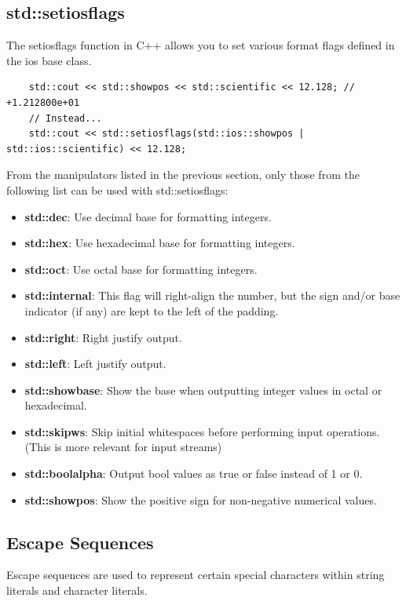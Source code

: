 \documentclass{report}
\begin{document}
    \subsection{std::setiosflags}
    The setiosflags function in C++ allows you to set various format flags defined in the ios base class. 
    \bigbreak \noindent 
    \sepline
    \begin{verbatim}
    std::cout << std::showpos << std::scientific << 12.128; // +1.212800e+01
    // Instead...
    std::cout << std::setiosflags(std::ios::showpos | std::ios::scientific) << 12.128; 
    \end{verbatim}
    \sepline
    \bigbreak \noindent 
    From the manipulators listed in the previous section, only those from the following list can be used with std::setiosflags:
    \begin{itemize}
        \item \textbf{std::dec}: Use decimal base for formatting integers.
        \item \textbf{std::hex}: Use hexadecimal base for formatting integers.
        \item \textbf{std::oct}: Use octal base for formatting integers.
        \item \textbf{std::internal}: This flag will right-align the number, but the sign and/or base indicator (if any) are kept to the left of the padding.
        \item \textbf{std::right}: Right justify output.
        \item \textbf{std::left}: Left justify output.
        \item \textbf{std::showbase}: Show the base when outputting integer values in octal or hexadecimal.
        \item \textbf{std::skipws}: Skip initial whitespaces before performing input operations. (This is more relevant for input streams)
        \item \textbf{std::boolalpha}: Output bool values as true or false instead of 1 or 0.
        \item \textbf{std::showpos}: Show the positive sign for non-negative numerical values.
    \end{itemize}

    \bigbreak \noindent 
    \subsection{Escape Sequences}
    \bigbreak \noindent 
    Escape sequences are used to represent certain special characters within string literals and character literals.
    \bigbreak \noindent 
\end{document}
